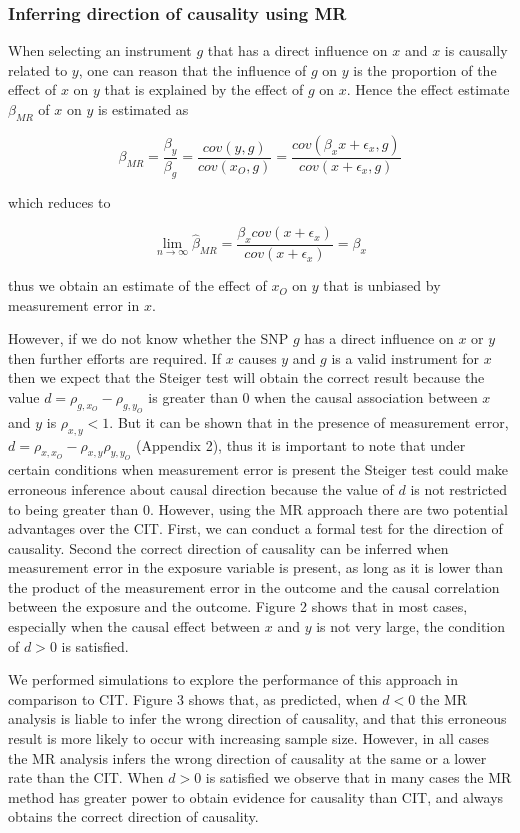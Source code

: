 \documentclass[]{article}
\begin{document}
\subsubsection{Inferring direction of causality using
MR}\label{inferring-direction-of-causality-using-mr}

When selecting an instrument \(g\) that has a direct influence on \(x\)
and \(x\) is causally related to \(y\), one can reason that the
influence of \(g\) on \(y\) is the proportion of the effect of \(x\) on
\(y\) that is explained by the effect of \(g\) on \(x\). Hence the
effect estimate \(\beta_{MR}\) of \(x\) on \(y\) is estimated as

\[
\beta_{MR} = \frac{\beta_y}{\beta_g} = \frac{cov(y, g)}{cov(x_O, g)} = \frac{cov(\beta_x x + \epsilon_x, g)}{cov(x + \epsilon_x, g)}
\]

which reduces to

\[
\lim_{n \to \infty} \hat{\beta}_{MR} = \frac{\beta_x cov(x + \epsilon_x)}{cov(x + \epsilon_x)} = \beta_x
\]

thus we obtain an estimate of the effect of \(x_O\) on \(y\) that is
unbiased by measurement error in \(x\).

However, if we do not know whether the SNP \(g\) has a direct influence
on \(x\) or \(y\) then further efforts are required. If \(x\) causes
\(y\) and \(g\) is a valid instrument for \(x\) then we expect that the
Steiger test will obtain the correct result because the value
\(d = \rho_{g, x_O} - \rho_{g, y_O}\) is greater than 0 when the causal
association between \(x\) and \(y\) is \(\rho_{x, y} < 1\). But it can
be shown that in the presence of measurement error,
\(d = \rho_{x, x_O} - \rho_{x,y}\rho_{y,y_O}\) (Appendix 2), thus it is
important to note that under certain conditions when measurement error
is present the Steiger test could make erroneous inference about causal
direction because the value of \(d\) is not restricted to being greater
than 0. However, using the MR approach there are two potential
advantages over the CIT. First, we can conduct a formal test for the
direction of causality. Second the correct direction of causality can be
inferred when measurement error in the exposure variable is present, as
long as it is lower than the product of the measurement error in the
outcome and the causal correlation between the exposure and the outcome.
Figure 2 shows that in most cases, especially when the causal effect
between \(x\) and \(y\) is not very large, the condition of \(d > 0\) is
satisfied.

We performed simulations to explore the performance of this approach in
comparison to CIT. Figure 3 shows that, as predicted, when \(d < 0\) the
MR analysis is liable to infer the wrong direction of causality, and
that this erroneous result is more likely to occur with increasing
sample size. However, in all cases the MR analysis infers the wrong
direction of causality at the same or a lower rate than the CIT. When
\(d > 0\) is satisfied we observe that in many cases the MR method has
greater power to obtain evidence for causality than CIT, and always
obtains the correct direction of causality.
\end{document}
